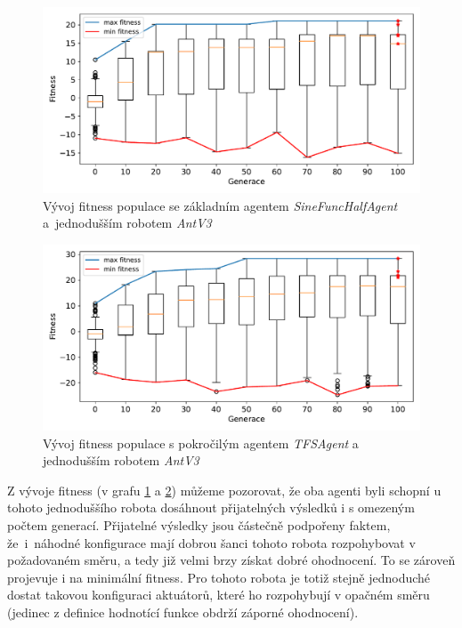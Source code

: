 \begin{figure}[h!]
    \centering
    \includegraphics[width=1\textwidth]{../img/experiment1_2_Sine_10ticks.pdf}
    \caption{Vývoj fitness populace se základním agentem
    \emph{SineFuncHalfAgent} a~jednodušším robotem \emph{AntV3}}
    \label{exp:first2_sinefull}
\end{figure}
\begin{figure}[h!]
    \includegraphics[width=1\textwidth]{../img/experiment1_2_TFS_10ticks.pdf}
    \caption{Vývoj fitness populace s pokročilým agentem \emph{TFSAgent} a
    jednodušším robotem \emph{AntV3}}
    \label{exp:first2_TFS}
\end{figure}

Z vývoje fitness (v grafu \ref{exp:first2_sinefull} a \ref{exp:first2_TFS})
můžeme pozorovat, že oba agenti byli schopní u tohoto jednoduššího robota
dosáhnout přijatelných výsledků i s omezeným počtem generací. Přijatelné
výsledky jsou částečně podpořeny faktem, že~i~náhodné konfigurace mají dobrou
šanci tohoto robota rozpohybovat v požadovaném směru, a tedy již velmi brzy
získat dobré ohodnocení. To se zároveň projevuje i na minimální fitness. Pro
tohoto robota je totiž stejně jednoduché dostat takovou konfiguraci aktuátorů,
které ho rozpohybují v opačném směru (jedinec z definice hodnotící funkce
obdrží záporné ohodnocení).

